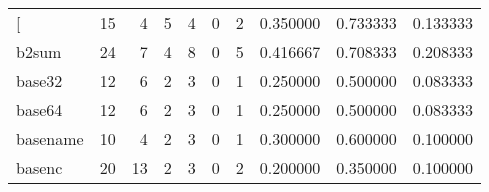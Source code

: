 \begin{longtable}{lrrrrrrrrr}
\bottomrule
\endlastfoot
{[}         &                                      15 &                                                  4 &                                                  5 &                                                  4 &                                                  0 &                                                  2 &                                           0.350000 &                               0.733333 &                             0.133333 \\
b2sum     &                                      24 &                                                  7 &                                                  4 &                                                  8 &                                                  0 &                                                  5 &                                           0.416667 &                               0.708333 &                             0.208333 \\
base32    &                                      12 &                                                  6 &                                                  2 &                                                  3 &                                                  0 &                                                  1 &                                           0.250000 &                               0.500000 &                             0.083333 \\
base64    &                                      12 &                                                  6 &                                                  2 &                                                  3 &                                                  0 &                                                  1 &                                           0.250000 &                               0.500000 &                             0.083333 \\
basename  &                                      10 &                                                  4 &                                                  2 &                                                  3 &                                                  0 &                                                  1 &                                           0.300000 &                               0.600000 &                             0.100000 \\
basenc    &                                      20 &                                                 13 &                                                  2 &                                                  3 &                                                  0 &                                                  2 &                                           0.200000 &                               0.350000 &                             0.100000 \\

\end{longtable}
